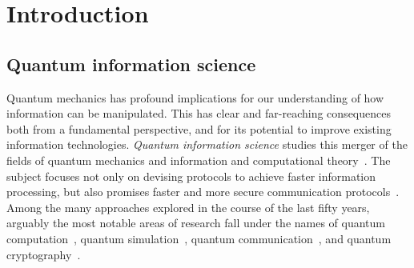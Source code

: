 
\chapter{Introduction}
\label{chapter:introduction}

\section{Quantum information science}

Quantum mechanics has profound implications for our understanding of how information can be manipulated.
This has clear and far-reaching consequences both from a fundamental perspective, and for its potential to improve existing information technologies.
\emph{Quantum information science} studies this merger of the fields of quantum mechanics and information and computational theory~\cite{nielsen2006quantum,watrous2018theory}.
The subject focuses not only on devising protocols to achieve faster information processing, but also promises faster and more secure communication protocols~\cite{gisin2002quantum,krenn2016quantum,pirandola2019advances}.
Among the many approaches explored in the course of the last fifty years, arguably the most notable areas of research fall under the names of quantum computation~\cite{shor1997polynomial,steane1998quantum,ladd2010quantum,wolf2019quantum}, quantum simulation~\cite{lloyd1996universal,georgescu2014quantum,koch2019quantum}, quantum communication~\cite{bennett1993teleporting,gisin2007quantum,krenn2016quantum}, and quantum cryptography~\cite{gisin2002quantum,bennett2014quantum}.


